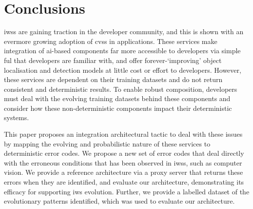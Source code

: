 


\section{Conclusions}
\label{fse2020:sec:conclusions}

\Glspl{iws} are gaining traction in the developer community, and this is shown with an evermore growing adoption of \glspl{cvs} in applications. These services make integration of \gls{ai}-based components far more accessible to developers via simple ful  that developers are familiar with, and offer forever-`improving' object localisation and detection models at little cost or effort to developers. However, these services are dependent on their training datasets and do not return consistent and deterministic results. To enable robust composition, developers must deal with the evolving training datasets behind these components and consider how these non-deterministic components impact their deterministic systems.

This paper proposes an integration architectural tactic to deal with these issues by mapping the evolving and probabilistic nature of these services to deterministic error codes. We propose a new set of error codes that deal directly with the erroneous conditions that has been observed in \glspl{iws}, such as computer vision. We provide a reference architecture via a proxy server that returns these errors when they are identified, and evaluate our architecture, demonstrating its efficacy for supporting \gls{iws} evolution. Further, we provide a labelled dataset of the evolutionary patterns identified, which was used to evaluate our architecture.


